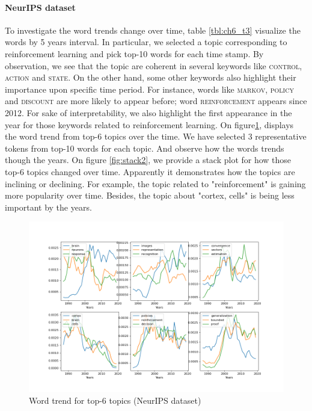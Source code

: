\paragraph{NeurIPS dataset} %
To investigate the word trends change over time, table \ref{tbl:ch6_t3} visualize the words by 5 years interval. In particular, we selected a topic corresponding to reinforcement learning and pick top-10 words for each time stamp. By observation, we see that the topic are coherent in several keywords like \textsc{control}, \textsc{action} and \textsc{state}. On the other hand, some other keywords also highlight their importance upon specific time period. For instance, words like \textsc{markov}, \textsc{policy} and \textsc{discount} are more likely to appear before; word \textsc{reinforcement} appears since 2012. For sake of interpretability, we also highlight the first appearance in the year for those keywords related to reinforcement learning.
On figure\ref{fig:scatter2}, displays the word trend from top-6 topics over the time. We have selected 3 representative tokens from top-10 words for each topic. And observe how the words trends though the years. 
On figure \ref{fig:stack2}, we provide a stack plot for how those top-6 topics changed over time. Apparently it demonstrates how the topics are inclining or declining. For example, the topic related to "reinforcement" is gaining more popularity over time. Besides, the topic about "cortex, cells" is being less important by the years.
\begin{figure}
\centering
\includegraphics[width=1\linewidth]{figures/1128/scatter(2)}
\caption{Word trend for top-6 topics (NeurIPS dataset)}
\label{fig:scatter2}
\end{figure}

